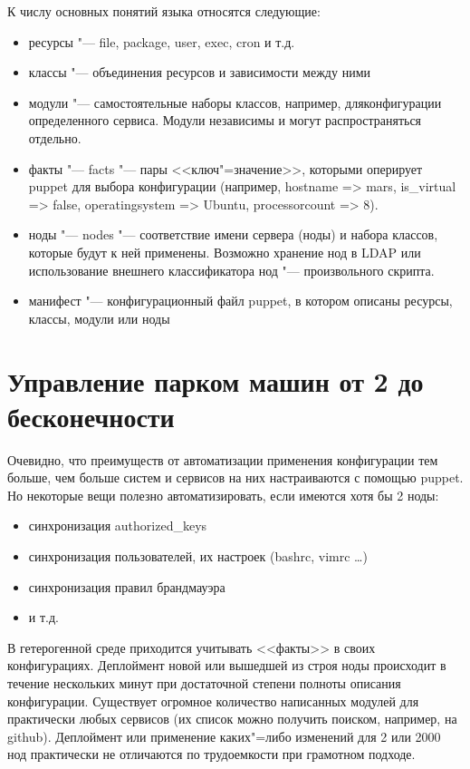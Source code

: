 \documentclass[10pt, a5paper]{article}
\begin{document}
К числу основных понятий языка относятся следующие:

\begin{itemize}
  \item ресурсы "--- file, package, user, exec, cron и т.д.
  \item классы "--- объединения ресурсов и зависимости между ними
  \item модули "--- самостоятельные наборы классов, например, для\linebreak конфигурации определенного сервиса. Модули независимы и могут распространяться отдельно.
  \item факты "--- facts "--- пары <<ключ"=значение>>, которыми оперирует puppet для выбора конфигурации (например, hostname =\textgreater{} mars, is\_virtual =\textgreater{} false, operatingsystem =\textgreater{} Ubuntu, \linebreak processorcount =\textgreater{} 8).
  \item ноды "--- nodes "--- соответствие имени сервера (ноды) и набора классов, которые будут к ней применены. Возможно хранение нод в LDAP или использование внешнего классификатора нод "--- произвольного скрипта.
  \item манифест "--- конфигурационный файл puppet, в котором описаны ресурсы, классы, модули или ноды
\end{itemize}

\section*{Управление парком машин от 2 до бесконечности}

Очевидно, что преимуществ от автоматизации применения конфигурации тем больше, чем больше систем и сервисов на них настраиваются с помощью puppet. Но некоторые вещи полезно автоматизировать, если имеются хотя бы 2 ноды:

\begin{itemize}
  \item синхронизация authorized\_keys
  \item синхронизация пользователей, их настроек (bashrc, vimrc \ldots{})
  \item синхронизация правил брандмауэра
  \item и т.д.
\end{itemize}

В гетерогенной среде приходится учитывать <<факты>> в своих конфигурациях. Деплоймент новой или вышедшей из строя ноды происходит в течение нескольких минут при достаточной степени полноты описания конфигурации. Существует огромное количество написанных модулей для практически любых сервисов (их список можно получить поиском, например, на github). Деплоймент или применение каких"=либо изменений для 2 или 2000 нод практически не отличаются по трудоемкости при грамотном подходе.
\end{document}
